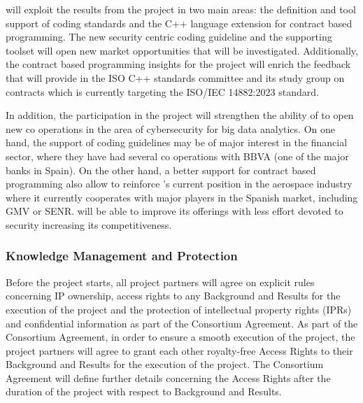\documentclass[a4paper,11pt]{article}
\begin{document}
\UCMshort{} will exploit the results from the project in two main areas:
the definition and tool support of coding standards and
the C++ language extension for contract based programming.
The new security centric coding guideline and the supporting toolset will
open new market opportunities that will be investigated.
Additionally, the contract based programming insights for the project
will enrich the feedback that \UCMshort{} will provide in the 
ISO C++ standards committee and its study group on contracts which
is currently targeting the ISO/IEC 14882:2023 standard.

In addition, the participation in the project will strengthen the ability of
\UCMshort{} to open new co operations in the area of cybersecurity for big data
analytics. On one hand, the support of coding guidelines may be of major
interest in the financial sector, where they have had several co operations with
BBVA (one of the major banks in Spain).  On the other hand, a better support for
contract based programming also allow to reinforce \UCMshort's current position
in the aerospace industry where it currently cooperates with major players in
the Spanish market, including GMV or SENR.  \UCMshort{} will be
able to improve its offerings with less effort devoted to security increasing
its competitiveness.


\horizontalline


\subsubsection{Knowledge Management and Protection}
\label{knowledgeprotection}
\vspace{-12pt}


Before the project starts, all project partners will agree on explicit rules concerning IP ownership, access rights to any
Background and Results for the execution of the project and the
protection of intellectual property rights (IPRs) and confidential
information as part of the Consortium Agreement.
As part of the Consortium Agreement, in order to ensure a smooth
execution of the project, the project partners will agree to grant each other
royalty-free Access Rights to their Background and Results for the
execution of the project. The Consortium Agreement will define further
details concerning the Access Rights after the duration of the project 
with respect to Background and Results.
\end{document}

